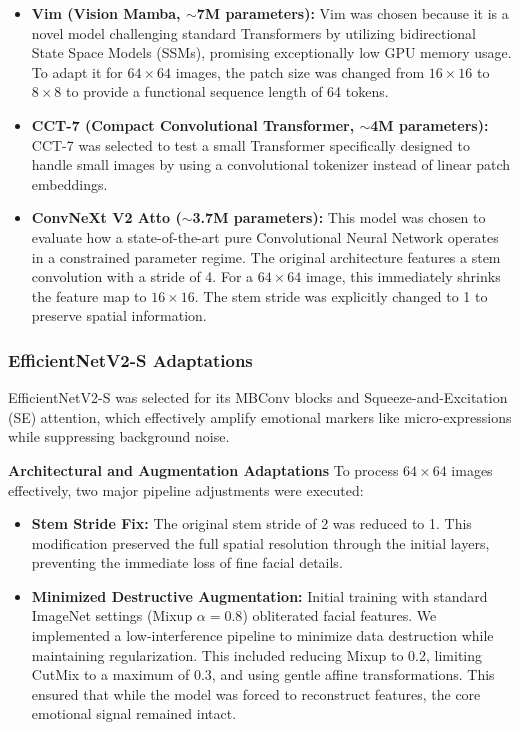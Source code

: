 \begin{itemize}
    \item \textbf{Vim (Vision Mamba, $\sim$7M parameters):} Vim \cite{zhu2024visionmambaefficientvisual} was chosen because it is a novel model challenging standard Transformers by utilizing bidirectional State Space Models (SSMs), promising exceptionally low GPU memory usage. To adapt it for $64 \times 64$ images, the patch size was changed from $16 \times 16$ to $8 \times 8$ to provide a functional sequence length of 64 tokens.
    \item \textbf{CCT-7 (Compact Convolutional Transformer, $\sim$4M parameters):} CCT-7 \cite{hassani2022escapingbigdataparadigm} was selected to test a small Transformer specifically designed to handle small images by using a convolutional tokenizer instead of linear patch embeddings.
    \item \textbf{ConvNeXt V2 Atto ($\sim$3.7M parameters):} This model \cite{woo2023convnextv2codesigningscaling} was chosen to evaluate how a state-of-the-art pure Convolutional Neural Network operates in a constrained parameter regime. The original architecture features a stem convolution with a stride of 4. For a $64 \times 64$ image, this immediately shrinks the feature map to $16 \times 16$. The stem stride was explicitly changed to 1 to preserve spatial information.
\end{itemize}

\subsubsection{EfficientNetV2-S Adaptations}
EfficientNetV2-S \cite{tan2021efficientnetv2smallermodelsfaster} was selected for its MBConv blocks and Squeeze-and-Excitation (SE) attention, which effectively amplify emotional markers like micro-expressions while suppressing background noise.

\textbf{Architectural and Augmentation Adaptations}
To process $64 \times 64$ images effectively, two major pipeline adjustments were executed:
\begin{itemize}
    \item \textbf{Stem Stride Fix:} The original stem stride of 2 was reduced to 1. This modification preserved the full spatial resolution through the initial layers, preventing the immediate loss of fine facial details.
    \item \textbf{Minimized Destructive Augmentation:} Initial training with standard ImageNet settings (Mixup $\alpha=0.8$) obliterated facial features. We implemented a low-interference pipeline to minimize data destruction while maintaining regularization. This included reducing Mixup to 0.2, limiting CutMix to a maximum of 0.3, and using gentle affine transformations. This ensured that while the model was forced to reconstruct features, the core emotional signal remained intact.
\end{itemize}

